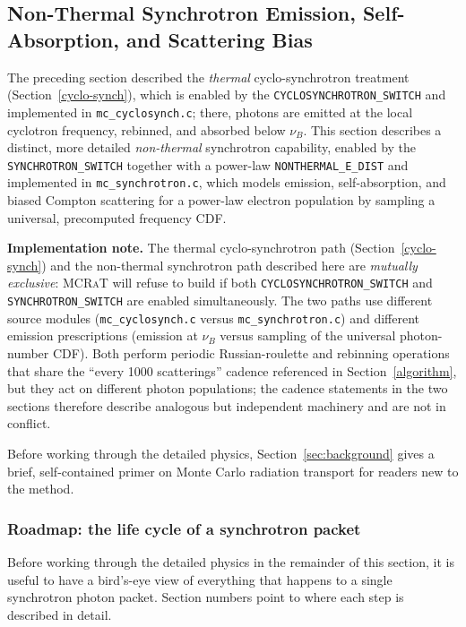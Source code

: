 \documentclass[12pt,a4paper]{article}
\newcommand{\mcrat}{\textsc{MCRaT}}
\newenvironment{implementationnote}{%
	\begin{framed}\noindent\textbf{Implementation note.}\quad}
	{\end{framed}}
\begin{document}
\subsection{Non-Thermal Synchrotron Emission, Self-Absorption, and Scattering Bias}
\label{sec:nonthermal_synch}
The preceding section described the \emph{thermal} cyclo-synchrotron
treatment (Section~\ref{cyclo-synch}), which is enabled by the
\texttt{CYCLOSYNCHROTRON\_SWITCH} and implemented in
\texttt{mc\_cyclosynch.c}; there, photons are emitted at the local
cyclotron frequency, rebinned, and absorbed below $\nu_B$. This section
describes a distinct, more detailed \emph{non-thermal} synchrotron
capability, enabled by the \texttt{SYNCHROTRON\_SWITCH} together with a
power-law \texttt{NONTHERMAL\_E\_DIST} and implemented in
\texttt{mc\_synchrotron.c}, which models emission, self-absorption, and
biased Compton scattering for a power-law electron population by sampling
a universal, precomputed frequency CDF.

\begin{implementationnote}
	The thermal cyclo-synchrotron path (Section~\ref{cyclo-synch}) and the
	non-thermal synchrotron path described here are \emph{mutually
		exclusive}: \mcrat{} will refuse to build if both
	\texttt{CYCLOSYNCHROTRON\_SWITCH} and \texttt{SYNCHROTRON\_SWITCH} are
	enabled simultaneously. The two paths use different source modules
	(\texttt{mc\_cyclosynch.c} versus \texttt{mc\_synchrotron.c}) and
	different emission prescriptions (emission at $\nu_B$ versus sampling of
	the universal photon-number CDF). Both perform periodic Russian-roulette
	and rebinning operations that share the ``every 1000 scatterings''
	cadence referenced in Section~\ref{algorithm}, but they act on different
	photon populations; the cadence statements in the two sections therefore
	describe analogous but independent machinery and are not in conflict.
\end{implementationnote}

Before working through the detailed physics, Section~\ref{sec:background}
gives a brief, self-contained primer on Monte Carlo radiation transport
for readers new to the method.


\subsubsection{Roadmap: the life cycle of a synchrotron packet}
\label{sec:roadmap}

Before working through the detailed physics in the remainder of this
section, it is useful to have a bird's-eye view of everything that
happens to a single synchrotron photon packet. Section numbers point
to where each step is described in detail.
\end{document}
